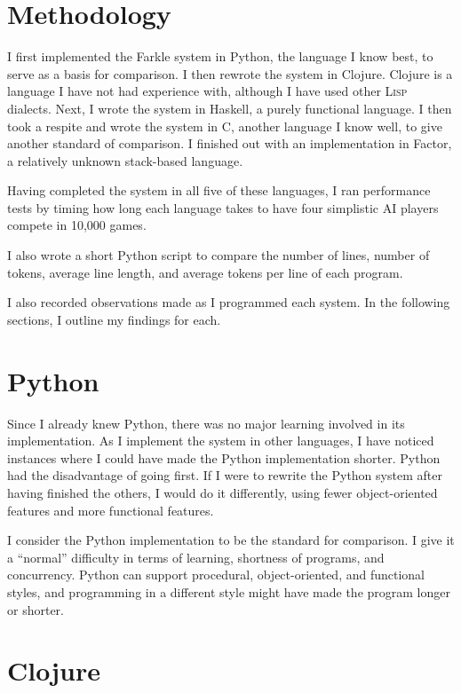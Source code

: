 \documentclass{article}
\begin{document}
\section{Methodology}

I first implemented the Farkle system in Python, the language I know best, to
serve as a basis for comparison.  I then rewrote the system in Clojure.  Clojure
is a language I have not had experience with, although I have used other
\textsc{Lisp} dialects.  Next, I wrote the system in Haskell, a purely
functional language.  I then took a respite and wrote the system in C, another
language I know well, to give another standard of comparison.  I finished out
with an implementation in Factor, a relatively unknown stack-based language.

Having completed the system in all five of these languages, I ran performance
tests by timing how long each language takes to have four simplistic AI players
compete in 10,000 games.

I also wrote a short Python script to compare the number of lines, number of
tokens, average line length, and average tokens per line of each program.

I also recorded observations made as I programmed each system.  In the following
sections, I outline my findings for each.

\section{Python}

Since I already knew Python, there was no major learning involved in its
implementation.  As I implement the system in other languages, I have noticed
instances where I could have made the Python implementation shorter.  Python had
the disadvantage of going first.  If I were to rewrite the Python system after
having finished the others, I would do it differently, using fewer
object-oriented features and more functional features.

I consider the Python implementation to be the standard for comparison.  I give
it a ``normal'' difficulty in terms of learning, shortness of programs, and
concurrency.  Python can support procedural, object-oriented, and functional
styles, and programming in a different style might have made the program longer
or shorter.

\section{Clojure}
\end{document}
